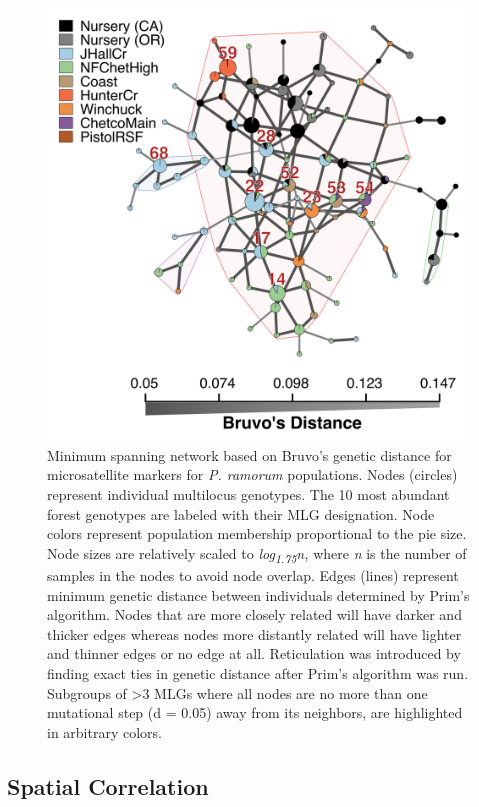 \documentclass[double,11pt]{beavtex}
\begin{document}
  \begin{figure}
  
  {\centering \includegraphics[width=0.75\linewidth]{figure/phytopathology/figure_3} 
  
  }
  
  \caption[Minimum spanning network based on Bruvo's genetic distance for
  microsatellite markers for \emph{P. ramorum} populations.]{Minimum spanning network based on Bruvo's genetic distance for
  microsatellite markers for \emph{P. ramorum} populations. Nodes
  (circles) represent individual multilocus genotypes. The 10 most
  abundant forest genotypes are labeled with their MLG designation. Node
  colors represent population membership proportional to the pie size.
  Node sizes are relatively scaled to \emph{log\textsubscript{1.75}n,}
  where \emph{n} is the number of samples in the nodes to avoid node
  overlap. Edges (lines) represent minimum genetic distance between
  individuals determined by Prim's algorithm. Nodes that are more closely
  related will have darker and thicker edges whereas nodes more distantly
  related will have lighter and thinner edges or no edge at all.
  Reticulation was introduced by finding exact ties in genetic distance
  after Prim's algorithm was run. Subgroups of \textgreater{}3 MLGs where
  all nodes are no more than one mutational step (d = 0.05) away from its
  neighbors, are highlighted in arbitrary colors.}\label{fig:ramorum3}
  \end{figure}
  
  \newpage
  
  \subsection{Spatial Correlation}\label{spatial-correlation}
  
\end{document}
